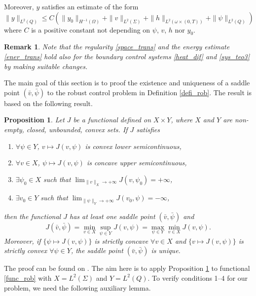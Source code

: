\documentclass[preprint,10pt]{article}
\newtheorem{proposition}[theorem]{Proposition}
\newtheorem{remark}[theorem]{Remark}
\numberwithin{equation}{section}
\numberwithin{theorem}{section}
\begin{document}
{Moreover, $y$ satisfies an estimate of the form
%
\begin{equation}\label{ener_trans}
\|y\|_{L^2(Q)}\leq C\left(\|y_0\|_{H^{-1}(\Omega)}+\|v\|_{L^2(\Sigma)}+\|h\|_{L^2(\omega\times(0,T))}+\|\psi\|_{L^2(Q)}\right)
\end{equation}
%
where $C$ is a positive constant not depending on $\psi$, $v$, $h$ nor $y_0$. 

\begin{remark}
Note that the regularity \eqref{space_trans} and the energy estimate \eqref{ener_trans} hold also for the boundary control systems \eqref{heat_dif} and \eqref{sys_teo3} by making suitable changes. 
\end{remark}

The main goal of this section is to proof the existence and uniqueness of a saddle point $(\bar v,\bar\psi)$ to the robust control problem in Definition \ref{defi_rob}. The result is based on the following result. 
%
\begin{proposition}\label{prop_saddle}
Let $J$ be a functional defined on $X\times Y$, where $X$ and $Y$ are non-empty, closed, unbounded, convex sets. If $J$ satisfies
%
\begin{enumerate}
\item $\forall \psi\in Y$, $v\mapsto J(v,\psi)$ is convex lower semicontinuous,
\item $\forall v\in X$, $\psi\mapsto J(v,\psi)$ is concave upper semicontinuous,
\item $\exists \psi_0\in X$ such that $\lim_{\|v\|_{X}\to+\infty}J(v,\psi_0)=+\infty$, 
\item $\exists v_0\in Y$ such that $\lim_{\|\psi\|_Y\to+\infty}J(v_0,\psi)=-\infty$,
\end{enumerate}
%
then the functional $J$ has at least one saddle point $(\bar v,\bar \psi)$ and
%
\begin{equation*}
J(\bar v,\bar \psi)=\min_{v\in X}\sup_{\psi\in Y} J(v,\psi)=\max_{\psi\in Y}\min_{v\in X}J(v,\psi).
\end{equation*}
%
Moreover, if $\{\psi\mapsto J(v,\psi)\}$ is strictly concave $\forall v\in X$ and $\{v\mapsto J(v,\psi)\}$ is strictly convex $\forall \psi\in Y$, the saddle point $(\bar v,\bar \psi)$ is unique. 
\end{proposition}

 The proof can be found on \cite[Prop. 1.5 and 2.2, Ch. VI]{Ekeland}. The aim here is to apply Proposition \ref{prop_saddle} to functional \eqref{func_rob} with $X=L^2(\Sigma)$ and $Y=L^2(Q)$. To verify conditions 1--4 for our problem, we need the following auxiliary lemma.

}
\end{document}
